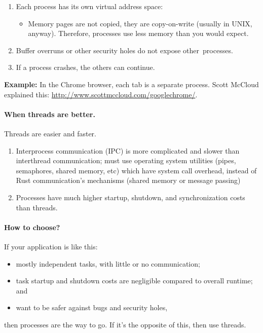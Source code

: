 \documentclass[a4paper]{report}
\begin{document}
  \begin{enumerate}
    \item Each process has its own virtual address space:
      \begin{itemize}
        \item Memory pages are not copied, they are copy-on-write (usually in UNIX, anyway). Therefore, processes use less memory than you would expect.
      \end{itemize}
    \item Buffer overruns or other security holes do not expose other~processes.
    \item If a process crashes, the others can continue.
  \end{enumerate}

{\bf Example:} In the Chrome browser, each tab is a separate
process. Scott McCloud explained this:
\url{http://www.scottmccloud.com/googlechrome/}.

\paragraph{When threads are better.} Threads are easier and faster.

  \begin{enumerate}
    \item Interprocess communication (IPC) is more complicated and slower than interthread
          communication; must use operating system utilities (pipes, semaphores, shared
              memory, etc) which have system call overhead, instead of Rust communication's mechanisms (shared memory or message passing)
	\item Processes have much higher startup, shutdown, and synchronization costs than threads.
  \end{enumerate}

\paragraph{How to choose?}
  If your application is like this:
  \begin{itemize}
    \item mostly independent tasks, with little or no communication;
    \item task startup and shutdown costs are negligible compared to overall runtime; and
    \item want to be safer against bugs and security holes,
  \end{itemize}
then processes are the way to go. If it's the opposite of this, then use threads.
\end{document}

